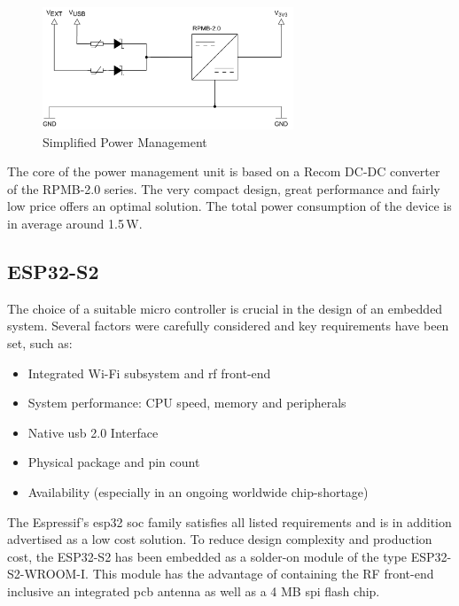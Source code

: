 \begin{figure}
\vspace{-0.7cm}
\includegraphics[width=7.5cm]{images/power}
\caption{Simplified Power Management}
\label{fig:simplified-power}
\end{figure} 
The core of the power management unit is based on a Recom DC-DC converter of the RPMB-2.0 series. The very compact design, great performance and fairly low price offers an optimal solution. The total power consumption of the device is in average around 1.5\,W.
\newpage

\subsection{ESP32-S2}
The choice of a suitable micro controller is crucial in the design of an embedded system. Several factors were carefully considered and key requirements have been set, such as:

\begin{itemize}
		\item Integrated Wi-Fi subsystem and \acrshort{rf} front-end
		\item System performance: CPU speed, memory and peripherals
		\item Native \acrshort{usb} 2.0 Interface
		\item Physical package and pin count
		\item Availability (especially in an ongoing worldwide chip-shortage)
\end{itemize}

The Espressif's \gls{esp32} \acrfull{soc} family satisfies all listed requirements and is in addition advertised as a low cost solution.\newline
To reduce design complexity and production cost, the ESP32-S2 has been embedded as a solder-on module of the type ESP32-S2-WROOM-I. This module has the advantage of containing the RF front-end inclusive an integrated \acrshort{pcb} antenna as well as a 4 MB \acrshort{spi} flash chip.

